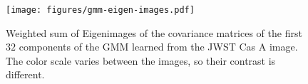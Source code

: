 \documentclass[twocolumn]{aastex631}
\newcommand{\todo}[1]{\textcolor{red}{TODO: #1}\PackageWarning{TODO:}{#1!}}
\begin{document}



    \begin{figure}
        \begin{centering}
            \texttt{[image: figures/gmm-eigen-images.pdf]}
            \caption{
                Weighted sum of Eigenimages of the covariance matrices of the first $32$ components of the GMM learned from the JWST Cas A image. The color scale varies between the images, so their contrast is different. 
            }
            \label{fig:gmm-eigen-images}
        \end{centering}
    \end{figure}
\end{document}
